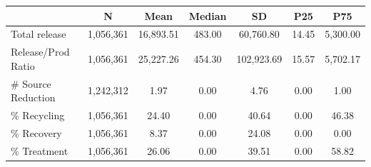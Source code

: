 {
\def\sym#1{\ifmmode^{#1}\else\(^{#1}\)\fi}
\begin{tabular}{l*{1}{cccccc}}
\toprule
                       &           N&        Mean&      Median&          SD&         P25&         P75\\
\midrule
Total release          &   1,056,361&   16,893.51&      483.00&   60,760.80&       14.45&    5,300.00\\
Release/Prod Ratio     &   1,056,361&   25,227.26&      454.30&  102,923.69&       15.57&    5,702.17\\
\# Source Reduction    &   1,242,312&        1.97&        0.00&        4.76&        0.00&        1.00\\
\% Recycling           &   1,056,361&       24.40&        0.00&       40.64&        0.00&       46.38\\
\% Recovery            &   1,056,361&        8.37&        0.00&       24.08&        0.00&        0.00\\
\% Treatment           &   1,056,361&       26.06&        0.00&       39.51&        0.00&       58.82\\
\bottomrule
\end{tabular}
}
